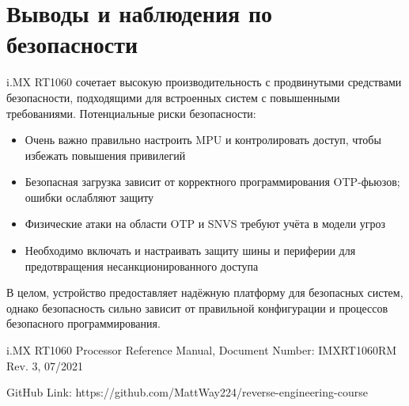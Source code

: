 \documentclass{article}
\begin{document}
\section{Выводы и наблюдения по безопасности}
i.MX RT1060 сочетает высокую производительность с продвинутыми средствами безопасности, подходящими для встроенных систем с повышенными требованиями. Потенциальные риски безопасности:
\begin{itemize}
    \item Очень важно правильно настроить MPU и контролировать доступ, чтобы избежать повышения привилегий
    \item Безопасная загрузка зависит от корректного программирования OTP-фьюзов; ошибки ослабляют защиту
    \item Физические атаки на области OTP и SNVS требуют учёта в модели угроз
    \item Необходимо включать и настраивать защиту шины и периферии для предотвращения несанкционированного доступа
    \end{itemize}
В целом, устройство предоставляет надёжную платформу для безопасных систем, однако безопасность сильно зависит от правильной конфигурации и процессов безопасного программирования.

\begin{thebibliography}{9}
i.MX RT1060 Processor Reference
Manual, Document Number: IMXRT1060RM
Rev. 3, 07/2021

GitHub Link: https://github.com/MattWay224/reverse-engineering-course

\end{thebibliography}
\end{document}
